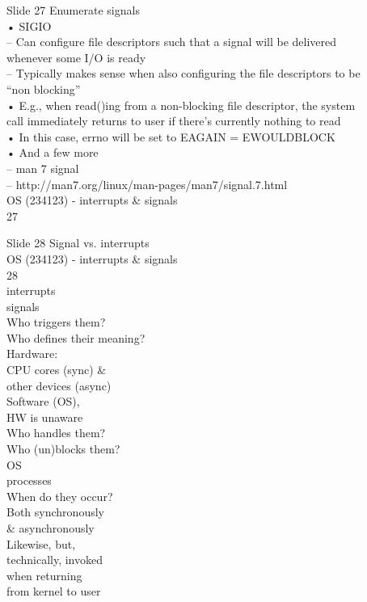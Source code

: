 \documentclass{beamer}
\begin{document}
\begin{frame}{Slide 27}
Enumerate signals\\• SIGIO\\– Can configure file descriptors such that a signal will be delivered \\whenever some I/O is ready\\– Typically makes sense when also configuring the file descriptors to be \\“non blocking” \\• E.g., when read()ing from a non-blocking file descriptor, the system \\call immediately returns to user if there’s currently nothing to read\\• In this case, errno will be set to EAGAIN = EWOULDBLOCK\\• And a few more\\– man 7 signal\\– http://man7.org/linux/man-pages/man7/signal.7.html\\OS (234123) - interrupts \& signals\\27
\end{frame}
\begin{frame}{Slide 28}
Signal vs. interrupts\\OS (234123) - interrupts \& signals\\28\\interrupts\\signals\\Who triggers them?\\Who defines their meaning?\\Hardware: \\CPU cores (sync) \& \\other devices (async) \\Software (OS), \\HW is unaware\\Who handles them?\\Who (un)blocks them?\\OS\\processes\\When do they occur?\\Both synchronously \\\& asynchronously\\Likewise, but, \\technically, invoked \\when returning \\from kernel to user
\end{frame}
\end{document}
